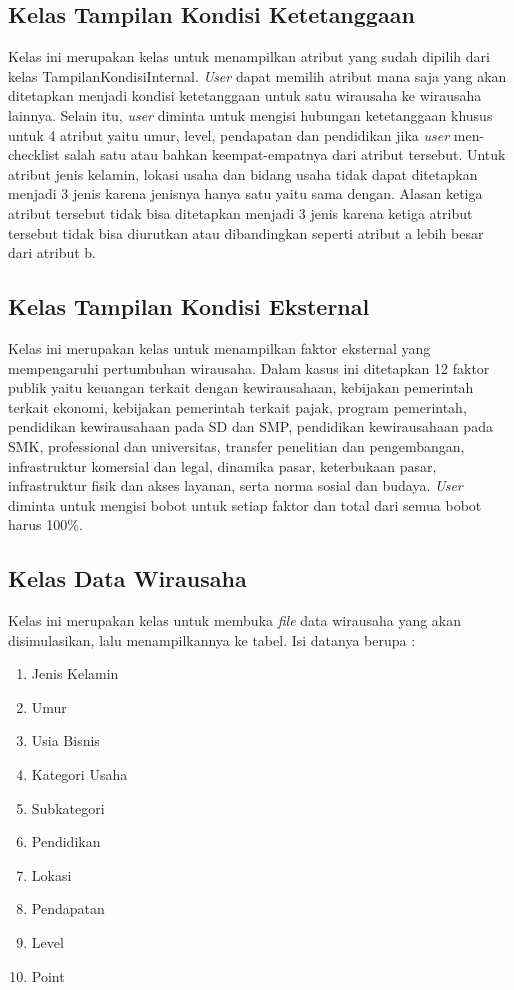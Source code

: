\subsection{Kelas Tampilan Kondisi Ketetanggaan}
Kelas ini merupakan kelas untuk menampilkan atribut yang sudah dipilih dari kelas TampilanKondisiInternal. \textit{User} dapat memilih atribut mana saja yang akan ditetapkan menjadi kondisi ketetanggaan untuk satu wirausaha ke wirausaha lainnya. Selain itu, \textit{user} diminta untuk mengisi hubungan ketetanggaan khusus untuk 4 atribut yaitu umur, level, pendapatan dan pendidikan jika \textit{user} men-checklist salah satu atau bahkan keempat-empatnya dari atribut tersebut. Untuk atribut jenis kelamin, lokasi usaha dan bidang usaha tidak dapat ditetapkan menjadi 3 jenis karena jenisnya hanya satu yaitu sama dengan. Alasan ketiga atribut tersebut tidak bisa ditetapkan menjadi 3 jenis karena ketiga atribut tersebut tidak bisa diurutkan atau dibandingkan seperti atribut a lebih besar dari atribut b.

\subsection{Kelas Tampilan Kondisi Eksternal}
Kelas ini merupakan kelas untuk menampilkan faktor eksternal yang mempengaruhi pertumbuhan wirausaha. Dalam kasus ini ditetapkan 12 faktor publik yaitu keuangan terkait dengan kewirausahaan, kebijakan pemerintah terkait ekonomi, kebijakan pemerintah terkait pajak, program pemerintah, pendidikan kewirausahaan pada SD dan SMP, pendidikan kewirausahaan pada SMK, professional dan universitas, transfer penelitian dan pengembangan, infrastruktur komersial dan legal, dinamika pasar, keterbukaan pasar, infrastruktur fisik dan akses layanan, serta norma sosial dan budaya. \textit{User} diminta untuk mengisi bobot untuk setiap faktor dan total dari semua bobot harus 100\%.

\subsection{Kelas Data Wirausaha}
Kelas ini merupakan kelas untuk membuka \textit{file} data wirausaha yang akan disimulasikan, lalu menampilkannya ke tabel. Isi datanya berupa :
\begin{enumerate}
	\item Jenis Kelamin
	\item Umur
	\item Usia Bisnis
	\item Kategori Usaha
	\item Subkategori
	\item Pendidikan
	\item Lokasi
	\item Pendapatan
	\item Level
	\item Point
\end{enumerate}

